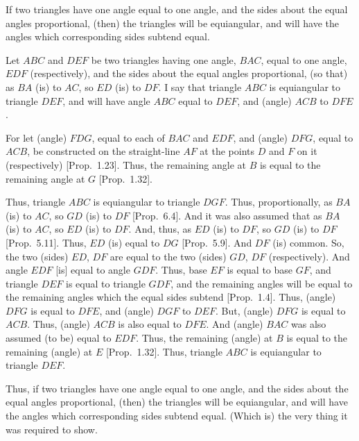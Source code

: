 \begin{Parallel}{}{}
{If two triangles have one angle equal to one angle,
and the sides about the equal angles proportional, (then) the triangles will
be equiangular, and will have the angles which corresponding sides subtend equal.

Let $ABC$ and $DEF$ be two triangles having one angle, $BAC$, equal to
one angle, $EDF$ (respectively), and the sides about the equal angles proportional,
(so that) as $BA$ (is) to $AC$, so $ED$ (is) to $DF$. I say that triangle $ABC$ is
equiangular to triangle $DEF$, and will have angle $ABC$ equal to
$DEF$, and (angle) $ACB$ to $DFE$.

\epsfysize=2.2in
\centerline{}

For let (angle) $FDG$, equal to each of $BAC$ and $EDF$, and (angle) $DFG$, equal to $ACB$, be constructed on the
straight-line $AF$ at the points $D$ and $F$ on it (respectively)   [Prop.~1.23]. Thus, the remaining angle at $B$
is equal to the remaining angle at $G$  [Prop.~1.32].

Thus, triangle $ABC$ is equiangular to triangle $DGF$. Thus, proportionally,
as $BA$ (is) to $AC$, so $GD$ (is) to $DF$ [Prop.~6.4].  And it was also assumed that as $BA$
(is) to $AC$, so $ED$ (is) to $DF$. And, thus, as $ED$ (is) to $DF$, so $GD$ (is) to $DF$ [Prop.~5.11]. Thus, $ED$ (is) equal to $DG$ [Prop.~5.9]. And $DF$ (is) common. So, the two
(sides) $ED$, $DF$ are equal to the two (sides) $GD$, $DF$ (respectively). And 
angle $EDF$ [is] equal to  angle $GDF$. Thus,  base $EF$ is equal to
base $GF$, and triangle $DEF$ is equal to triangle $GDF$, and the remaining
angles will be equal to the remaining angles which the equal sides subtend
 [Prop.~1.4]. Thus, (angle) $DFG$ is equal to $DFE$, and (angle) $DGF$ to
$DEF$. But, (angle) $DFG$ is equal to $ACB$. Thus, (angle) $ACB$ is also equal
to $DFE$. And  (angle) $BAC$ was also assumed (to be) equal to $EDF$. 
Thus, the remaining (angle) at $B$ is equal to the remaining (angle) at $E$  [Prop.~1.32]. Thus, triangle $ABC$ is equiangular to triangle $DEF$.

Thus, if two triangles have one angle equal to one angle,
and the sides about the equal angles proportional, (then) the triangles will
be equiangular, and will have the angles which corresponding sides subtend equal. (Which is) the very thing it was required to show.}
\end{Parallel}

